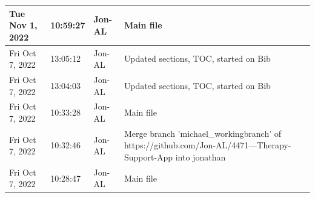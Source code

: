\documentclass[11pt]{article}
\begin{document}
\begin{center}
\begin{longtable}{|p{2.7cm}|l|p{2cm}|p{8cm}|}
           \hline Tue Nov 1, 2022                            & 10:59:27                           & Jon-AL                                  & Main file                                                                                                                                                                                                                                                                                                  \\
           \hline Fri Oct 7, 2022                            & 13:05:12                           & Jon-AL                                  & Updated sections, TOC, started on Bib                                                                                                                                                                                                                                                                      \\
           \hline Fri Oct 7, 2022                            & 13:04:03                           & Jon-AL                                  & Updated sections, TOC, started on Bib                                                                                                                                                                                                                                                                      \\
           \hline Fri Oct 7, 2022                            & 10:33:28                           & Jon-AL                                  & Main file                                                                                                                                                                                                                                                                                                  \\
           \hline Fri Oct 7, 2022                            & 10:32:46                           & Jon-AL                                  & Merge branch 'michael\_workingbranch' of https://github.com/Jon-AL/4471---Therapy-Support-App into jonathan                                                                                                                                                                                                 \\
           \hline Fri Oct 7, 2022                            & 10:28:47                           & Jon-AL                                  & Main file                                                                                                                                                                                                                                                                                                  \\

\end{longtable}
\end{center}
\end{document}

